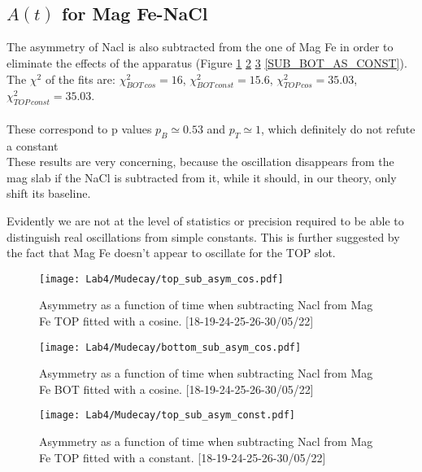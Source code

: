 \documentclass[10pt,a4paper,twocolumn]{article}
\begin{document}
\\
\\

\subsection{$A(t)$ for Mag Fe-NaCl}

The asymmetry of Nacl is also subtracted from the one of Mag Fe in order to eliminate the effects of the apparatus (Figure \ref{SUB_TOP_AS}  \ref{SUB_BOT_AS} \ref{SUB_TOP_AS_CONST}  \ref{SUB_BOT_AS_CONST}). 
\\
The $\chi^2$ of the fits are: $\chi^2_{BOT \, cos} = 16$,  $\chi^2_{BOT \, const} = 15.6$, $\chi^2_{TOP \, cos} = 35.03$,  $\chi^2_{TOP \, const} = 35.03$. 
\\
\\
These correspond to p values $p_B\simeq 0.53$ and $p_T\simeq 1$, which definitely do not refute a constant
\\
These results are very concerning, because the oscillation disappears from the mag slab if the NaCl is subtracted from it, while it should, in our theory, only shift its baseline.

Evidently we are not at the level of statistics or precision required to be able to distinguish real oscillations from simple constants. This is further suggested by the fact that Mag Fe doesn't appear to oscillate for the TOP slot.

\begin{figure}[h!]
\centering
\caption{Asymmetry as a function of time when subtracting Nacl from Mag Fe TOP fitted with a cosine. [18-19-24-25-26-30/05/22]}
\texttt{[image: Lab4/Mudecay/top\_sub\_asym\_cos.pdf]} 
\label{SUB_TOP_AS}
\end{figure}

\begin{figure}[h!]
\centering
\caption{Asymmetry as a function of time when subtracting Nacl from Mag Fe BOT fitted with a cosine. [18-19-24-25-26-30/05/22]}
\texttt{[image: Lab4/Mudecay/bottom\_sub\_asym\_cos.pdf]} 
\label{SUB_BOT_AS}
\end{figure}

\begin{figure}[h!]
\centering
\caption{Asymmetry as a function of time when subtracting Nacl from Mag Fe TOP fitted with a constant. [18-19-24-25-26-30/05/22]}
\texttt{[image: Lab4/Mudecay/top\_sub\_asym\_const.pdf]} 
\label{SUB_TOP_AS_CONST}
\end{figure}
\end{document}
